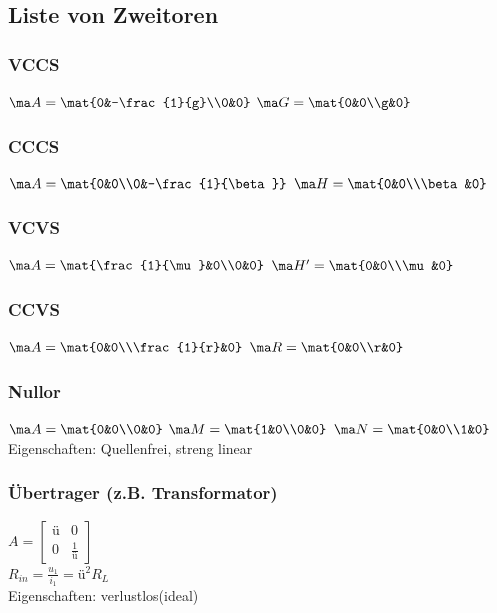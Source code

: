 \documentclass[fs, footer]{latex4ei}
\begin{document}
\begin{multicols*}{4}
    \subsection{Liste von Zweitoren}
    \subsubsection{VCCS}
    $\ma A = \mat{0&-\frac{1}{g}\\0&0}$\quad
    $\ma G = \mat{0&0\\g&0}$
    \subsubsection{CCCS}
    $\ma A = \mat{0&0\\0&-\frac{1}{\beta}}$\quad
    $\ma H = \mat{0&0\\\beta&0}$
    \subsubsection{VCVS}
    $\ma A = \mat{\frac{1}{\mu}&0\\0&0}$\quad
    $\ma H' = \mat{0&0\\\mu&0}$
    \subsubsection{CCVS}
    $\ma A = \mat{0&0\\\frac{1}{r}&0}$\quad
    $\ma R = \mat{0&0\\r&0}$

    \subsubsection{Nullor}
    $\ma A = \mat{0&0\\0&0}$\quad
    $\ma M = \mat{1&0\\0&0}$\quad
    $\ma N = \mat{0&0\\1&0}$\\
    Eigenschaften: Quellenfrei, streng linear

    \subsubsection{Übertrager (z.B. Transformator)}
    $A=\begin{bmatrix} \text{ü} & 0 \\ 0 & \frac{1}{\text{ü}} \end{bmatrix}$\\
    $R_{in}=\frac{u_1}{i_1}=\text{ü}^2 R_L$\\
    Eigenschaften: verlustlos(ideal)



\end{multicols*}
\end{document}
